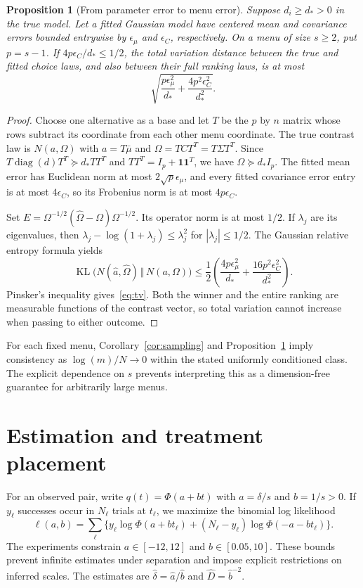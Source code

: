 \documentclass[11pt]{amsart}
\newtheorem{proposition}[theorem]{Proposition}
\theoremstyle{definition}\newtheorem{example}[theorem]{Example}
\theoremstyle{remark}\newtheorem{remark}[theorem]{Remark}
\newcommand{\one}{\mathbf 1}\newcommand{\diag}{\operatorname{diag}}
\newcommand{\KL}{\operatorname{KL}}\newcommand{\argmax}{\operatorname*{arg\,max}}
\begin{document}
\begin{proposition}[From parameter error to menu error]\label{prop:menu}
Suppose $d_i\geq d_*>0$ in the true model. Let a fitted Gaussian model have centered mean and covariance errors bounded entrywise by $\epsilon_\mu$ and $\epsilon_C$, respectively. On a menu of size $s\geq2$, put $p=s-1$. If $4p\epsilon_C/d_*\leq1/2$, the total variation distance between the true and fitted choice laws, and also between their full ranking laws, is at most
\begin{equation}\label{eq:tv}
 \sqrt{\frac{p\epsilon_\mu^2}{d_*}
       +\frac{4p^2\epsilon_C^2}{d_*^2}}.
\end{equation}
\end{proposition}
\begin{proof}
Choose one alternative as a base and let $T$ be the $p$ by $n$ matrix whose rows subtract its coordinate from each other menu coordinate. The true contrast law is $N(a,\Omega)$ with $a=T\bar\mu$ and $\Omega=TCT^T=T\Sigma T^T$. Since $T\diag(d)T^T\succeq d_*TT^T$ and $TT^T=I_p+\one\one^T$, we have $\Omega\succeq d_*I_p$. The fitted mean error has Euclidean norm at most $2\sqrt p\epsilon_\mu$, and every fitted covariance error entry is at most $4\epsilon_C$, so its Frobenius norm is at most $4p\epsilon_C$.

Set $E=\Omega^{-1/2}(\widehat\Omega-\Omega)\Omega^{-1/2}$. Its operator norm is at most $1/2$. If $\lambda_j$ are its eigenvalues, then $\lambda_j-\log(1+\lambda_j)\leq\lambda_j^2$ for $|\lambda_j|\leq1/2$. The Gaussian relative entropy formula yields
\[
 \KL\bigl(N(\widehat a,\widehat\Omega)\,\Vert\,N(a,\Omega)\bigr)
 \leq\frac12\left(\frac{4p\epsilon_\mu^2}{d_*}
                  +\frac{16p^2\epsilon_C^2}{d_*^2}\right).
\]
Pinsker's inequality gives~\eqref{eq:tv}. Both the winner and the entire ranking are measurable functions of the contrast vector, so total variation cannot increase when passing to either outcome.
\end{proof}

For each fixed menu, Corollary~\ref{cor:sampling} and Proposition~\ref{prop:menu} imply consistency as $\log(m)/N\to0$ within the stated uniformly conditioned class. The explicit dependence on $s$ prevents interpreting this as a dimension-free guarantee for arbitrarily large menus.

\section{Estimation and treatment placement}\label{sec:estimation}
For an observed pair, write $q(t)=\Phi(a+bt)$ with $a=\delta/s$ and $b=1/s>0$. If $y_\ell$ successes occur in $N_\ell$ trials at $t_\ell$, we maximize the binomial log likelihood
\begin{equation}\label{eq:pairlik}
 \ell(a,b)=\sum_\ell\{y_\ell\log\Phi(a+bt_\ell)
 +(N_\ell-y_\ell)\log\Phi(-a-bt_\ell)\}.
\end{equation}
The experiments constrain $a\in[-12,12]$ and $b\in[0.05,10]$. These bounds prevent infinite estimates under separation and impose explicit restrictions on inferred scales. The estimates are $\widehat\delta=\widehat a/\widehat b$ and $\widehat D=\widehat b^{-2}$.
\end{document}
